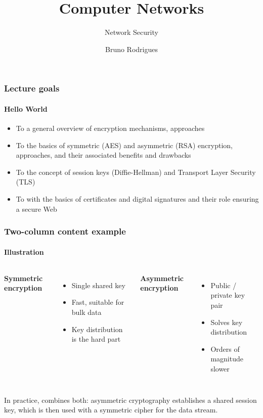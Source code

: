 \documentclass[aspectratio=169]{beamer}
\title{Computer Networks}
\subtitle{Network Security}
\author{Bruno Rodrigues}
\institute{University of St.\,Gallen\\Bachelor in Computer Science\\Computer Networks (2,906)}
\date{}
\begin{document}
\begin{frame}[plain]
  \titlepage
\end{frame}

\begin{frame}
\frametitle{Lecture goals}
\framesubtitle{Hello World}

\begin{itemize}
  \setlength\itemsep{0.5em}
  \item To  a general overview of encryption mechanisms, approaches
  \item To  the basics of symmetric (AES) and asymmetric (RSA) encryption, approaches, and their associated benefits and drawbacks
  \item To  the concept of session keys (Diffie-Hellman) and Transport Layer Security (TLS)
  \item To  with the basics of certificates and digital signatures and their role ensuring a secure Web
\end{itemize}
\end{frame}



\begin{frame}
\frametitle{Two-column content example}
\framesubtitle{Illustration}

\begin{columns}[T]
    \textbf{\color{HSGgreen} Symmetric encryption}
    \begin{itemize}
      \item Single shared key
      \item Fast, suitable for bulk data
      \item Key distribution is the hard part
    \end{itemize}
    \textbf{\color{HSGgreen} Asymmetric encryption}
    \begin{itemize}
      \item Public / private key pair
      \item Solves key distribution
      \item Orders of magnitude slower
    \end{itemize}
\end{columns}

\vspace{1em}
In practice,  combines both: asymmetric cryptography establishes a
shared session key, which is then used with a symmetric cipher for the data stream.
\end{frame}
\end{document}
